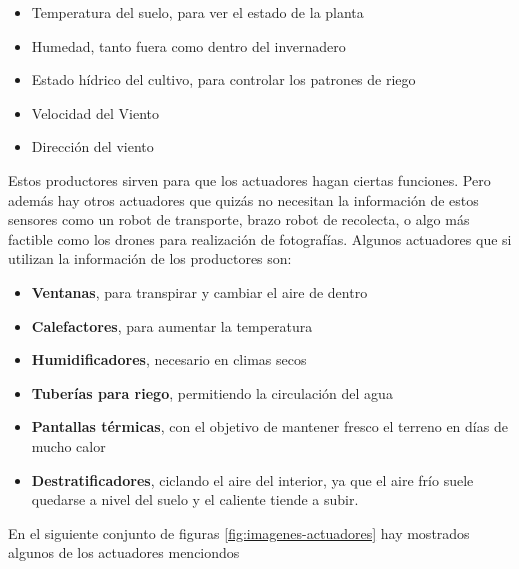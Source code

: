 \begin{itemize}
    \item Temperatura del suelo, para ver el estado de la planta
    \item Humedad, tanto fuera como dentro del invernadero
    \item Estado hídrico del cultivo, para controlar los patrones de riego
    \item Velocidad del Viento
    \item Dirección del viento
\end{itemize}

Estos productores sirven para que los actuadores hagan ciertas funciones. Pero además hay otros actuadores que quizás no necesitan la información de estos sensores como un robot de transporte, brazo robot de recolecta, o algo más factible como los drones para realización de fotografías. Algunos actuadores que si utilizan la información de los productores son:

\begin{itemize}
    \item \textbf{Ventanas}, para transpirar y cambiar el aire de dentro
    \item \textbf{Calefactores}, para aumentar la temperatura
    \item \textbf{Humidificadores}, necesario en climas secos
    \item \textbf{Tuberías para riego}, permitiendo la circulación del agua
    \item \textbf{Pantallas térmicas}, con el objetivo de mantener fresco el terreno en días de mucho calor
    \item \textbf{Destratificadores}, ciclando el aire del interior, ya que el aire frío suele quedarse a nivel del suelo y el caliente tiende a subir.
\end{itemize}

En el siguiente conjunto de figuras \ref{fig:imagenes-actuadores} hay mostrados algunos de los actuadores menciondos

